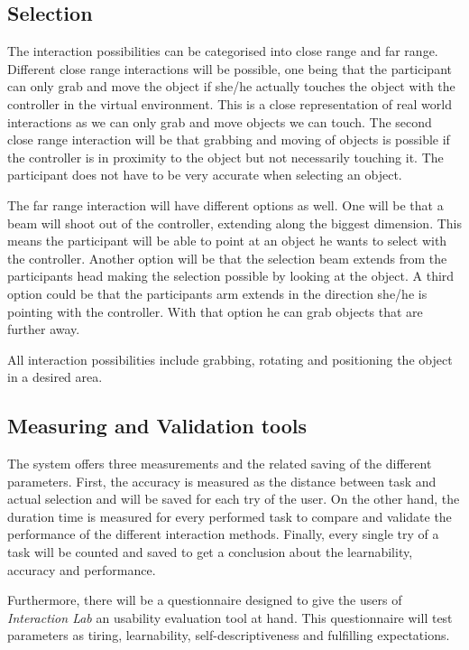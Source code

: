 \documentclass[a4paper, 12pt]{article}
\begin{document}
\subsection{Selection}
The interaction possibilities can be categorised into close range and far range. Different close range interactions will be possible, one being that the participant can only grab and move the object if she/he actually touches the object with the controller in the virtual environment. This is a close representation of real world interactions as we can only grab and move objects we can touch. 
The second close range interaction will be that grabbing and moving of objects is possible if the controller is in proximity to the object but not necessarily touching it. The participant does not have to be very accurate when selecting an object. 

The far range interaction will have different options as well. One will be that a beam will shoot out of the controller, extending along the biggest dimension. This means the participant will be able to point at an object he wants to select with the controller. 
Another option will be that the selection beam extends from the participants head making the selection possible by looking at the object. 
A third option could be that the participants arm extends in the direction she/he is pointing with the controller. With that option he can grab objects that are further away. 

All interaction possibilities include grabbing, rotating and positioning the object in a desired area.  

\subsection{Measuring and Validation tools}

 The system offers three measurements and the related saving of the different parameters. First, the accuracy is measured as the distance between task and actual selection and will be saved for each try of the user. On the other hand, the duration time is measured for every performed task to compare and validate the performance of the different interaction methods. Finally, every single try of a task will be counted and saved to get a conclusion about the learnability, accuracy and performance.
 
 Furthermore, there will be a questionnaire designed to give the users of  \textit{Interaction Lab} an usability evaluation tool at hand. This questionnaire will test parameters as tiring, learnability, self-descriptiveness and fulfilling expectations.
\end{document}
